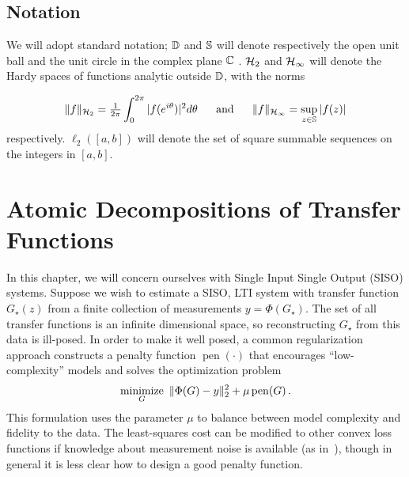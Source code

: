 \subsection*{Notation}\label{sec:notation}

We will adopt standard notation; $\mathbb{D}$ and $\mathbb{S}$ will denote respectively the
open unit ball and the unit circle in the complex plane $\mathbb{C}$ . $\mathcal{H}_2$ and
$\mathcal{H}_\infty$ will denote the Hardy spaces of functions analytic outside $\mathbb{D}$,
with the norms

\[\|f\|_{\mathcal{H}_2} = \tfrac{1}{2\pi} \int_0^{2\pi} |f(e^{i\theta})|^2 d\theta~~~~~\mbox{and}~~~~~\|f\|_{\mathcal{H}_\infty} = \sup_{z\in\mathbb{S}} |f(z)|\]
respectively.  $\ell_2([a,b])$ will denote the set of square summable sequences on the integers in $[a, b]$.

\section{Atomic Decompositions of Transfer Functions}\label{sec:atomic-def}
In this chapter, we will concern ourselves with Single Input Single Output
(SISO) systems. Suppose we wish to estimate a SISO, LTI system with transfer
function $G_\star(z)$ from a finite collection of measurements
$y=\Phi(G_\star)$. The set of all transfer functions is an infinite dimensional
space, so reconstructing $G_\star$ from this data is ill-posed. In order to make
it well posed, a common regularization approach constructs a penalty function
$\operatorname{pen}(\cdot)$ that encourages ``low-complexity'' models and solves
the optimization problem
\begin{equation}\label{eq:regularized}
	\mathop{\operatorname{minimize}}_G~\|\Phi(G)-y\|_2^2 + \mu \operatorname{pen}(G) \,.
\end{equation}
This formulation uses the parameter $\mu$ to balance between model complexity
and fidelity to the data. The least-squares cost can be modified to other convex
loss functions if knowledge about measurement noise is available (as
in~\cite{Smith12,Paganini96}), though in general it is less clear how to design
a good penalty function.

